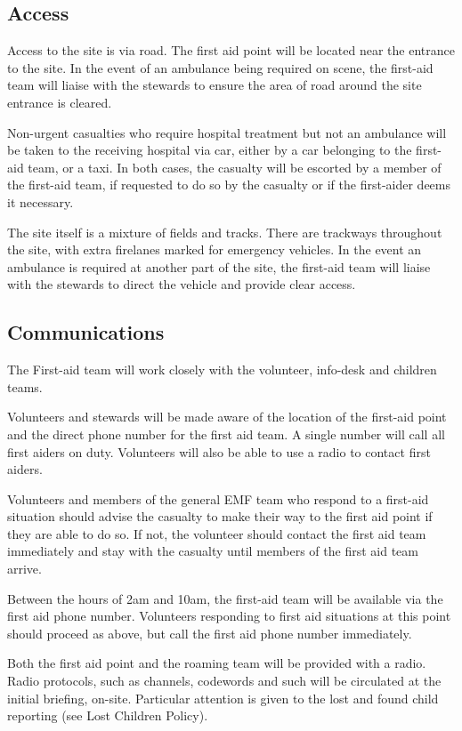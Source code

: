 \subsection{Access}

Access to the site is via road. The first aid point will be located near the
entrance to the site. In the event of an ambulance being required on scene, the
first-aid team will liaise with the stewards to ensure the area of road around
the site entrance is cleared.

Non-urgent casualties who require hospital treatment but not an ambulance will
be taken to the receiving hospital via car, either by a car belonging to the
first-aid team, or a taxi. In both cases, the casualty will be escorted by a
member of the first-aid team, if requested to do so by the casualty or if the
first-aider deems it necessary.

The site itself is a mixture of fields and tracks. There are
trackways throughout the site, with extra firelanes marked for emergency
vehicles. In the event an ambulance is required at another part of the site,
the first-aid team will liaise with the stewards to direct the vehicle and
provide clear access.

\subsection{Communications}

The First-aid team will work closely with the volunteer, info-desk and children
teams.

Volunteers and stewards will be made aware of the location of the first-aid
point and the direct phone number for the first aid team. A single number will 
call all first aiders on duty. Volunteers will also be able to use a radio to 
contact first aiders.

Volunteers and members of the general EMF team who respond to a first-aid
situation should advise the casualty to make their way to the first aid point
if they are able to do so. If not, the volunteer should contact the first aid
team immediately and stay with the casualty until members of the first aid team
arrive.

Between the hours of 2am and 10am, the first-aid team will be available via the
first aid phone number. Volunteers responding to first aid situations at this
point should proceed as above, but call the first aid phone number
immediately.

Both the first aid point and the roaming team will be provided with a radio.
Radio protocols, such as channels, codewords and such will be circulated at the
initial briefing, on-site. Particular attention is given to the lost and found
child reporting (see Lost Children Policy).

